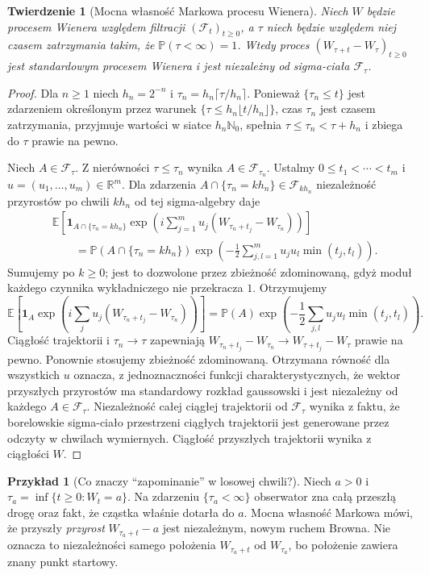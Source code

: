 \documentclass[11pt,a4paper,oneside]{report}
\numberwithin{equation}{chapter}
\theoremstyle{plain}
\newtheorem{twierdzenie}{Twierdzenie}[chapter]
\theoremstyle{definition}
\newtheorem{przyklad}{Przykład}[chapter]
\theoremstyle{remark}
\newcommand{\R}{\mathbb{R}}
\newcommand{\N}{\mathbb{N}}
\newcommand{\Prob}{\mathbb{P}}
\newcommand{\E}{\mathbb{E}}
\newcommand{\calF}{\mathcal{F}}
\newcommand{\ind}[1]{\mathbf{1}_{#1}}
\begin{document}
\begin{twierdzenie}[Mocna własność Markowa procesu Wienera]
Niech $W$ będzie procesem Wienera względem filtracji
$(\calF_t)_{t\ge0}$, a $\tau$ niech będzie względem niej
czasem zatrzymania takim, że $\Prob(\tau<\infty)=1$.
Wtedy proces $(W_{\tau+t}-W_\tau)_{t\ge0}$ jest
standardowym procesem Wienera i jest niezależny od
sigma-ciała $\calF_\tau$.
\end{twierdzenie}
\begin{proof}
Dla $n\ge1$ niech $h_n=2^{-n}$ i
$\tau_n=h_n\lceil\tau/h_n\rceil$.
Ponieważ $\{\tau_n\le t\}$ jest zdarzeniem określonym
przez warunek $\{\tau\le h_n\lfloor t/h_n\rfloor\}$,
czas $\tau_n$ jest czasem zatrzymania, przyjmuje wartości
w siatce $h_n\N_0$, spełnia $\tau\le\tau_n<\tau+h_n$
i zbiega do $\tau$ prawie na pewno.

Niech $A\in\calF_\tau$. Z nierówności $\tau\le\tau_n$
wynika $A\in\calF_{\tau_n}$. Ustalmy
$0\le t_1<\cdots<t_m$ i $u=(u_1,\ldots,u_m)\in\R^m$.
Dla zdarzenia $A\cap\{\tau_n=kh_n\}\in\calF_{kh_n}$
niezależność przyrostów po chwili $kh_n$ od tej
sigma-algebry daje
\begin{align*}
&\E\left[\ind{A\cap\{\tau_n=kh_n\}}
\exp\left(i\sum_{j=1}^m u_j(W_{\tau_n+t_j}-W_{\tau_n})\right)\right]\\
&\qquad=\Prob(A\cap\{\tau_n=kh_n\})
\exp\left(-\frac12\sum_{j,l=1}^m u_ju_l\min(t_j,t_l)\right).
\end{align*}
Sumujemy po $k\ge0$; jest to dozwolone przez
zbieżność zdominowaną, gdyż moduł każdego czynnika
wykładniczego nie przekracza $1$. Otrzymujemy
\[
\E\left[\ind A\exp\left(i\sum_j u_j
(W_{\tau_n+t_j}-W_{\tau_n})\right)\right]
=\Prob(A)\exp\left(-\frac12\sum_{j,l}
 u_ju_l\min(t_j,t_l)\right).
\]
Ciągłość trajektorii i $\tau_n\to\tau$ zapewniają
$W_{\tau_n+t_j}-W_{\tau_n}\to W_{\tau+t_j}-W_\tau$
prawie na pewno. Ponownie stosujemy zbieżność zdominowaną.
Otrzymana równość dla wszystkich $u$ oznacza, z jednoznaczności
funkcji charakterystycznych, że wektor przyszłych przyrostów
ma standardowy rozkład gaussowski i jest niezależny
od każdego $A\in\calF_\tau$. Niezależność
całej ciągłej trajektorii od $\calF_\tau$ wynika z faktu,
że borelowskie sigma-ciało przestrzeni ciągłych trajektorii
jest generowane przez odczyty w chwilach wymiernych.
Ciągłość przyszłych trajektorii wynika z ciągłości $W$.
\end{proof}

\begin{przyklad}[Co znaczy ``zapominanie'' w losowej chwili?]
Niech $a>0$ i $\tau_a=\inf\{t\ge0:W_t=a\}$.
Na zdarzeniu $\{\tau_a<\infty\}$ obserwator zna
całą przeszłą drogę oraz fakt, że cząstka właśnie dotarła
do $a$. Mocna własność Markowa mówi, że przyszły \emph{przyrost}
$W_{\tau_a+t}-a$ jest niezależnym, nowym ruchem Browna.
Nie oznacza to niezależności samego położenia $W_{\tau_a+t}$
od $W_{\tau_a}$, bo położenie zawiera znany punkt startowy.
\end{przyklad}
\end{document}
